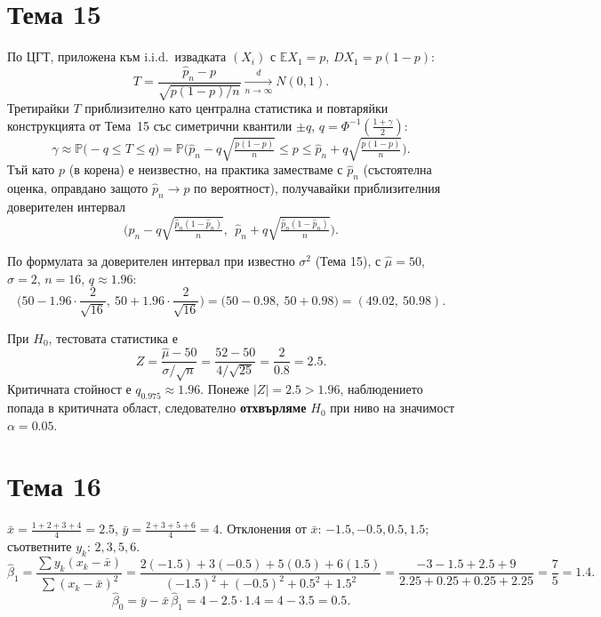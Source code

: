 \section*{Тема 15}

\begin{proofbox}
По ЦГТ, приложена към i.i.d.\ извадката $(X_i)$ с $\mathbb EX_1=p$,
$DX_1=p(1-p)$:
\[
  T = \frac{\hat p_n-p}{\sqrt{p(1-p)/n}} \xrightarrow[n\to\infty]{d}
  N(0,1).
\]
Третирайки $T$ приблизително като централна статистика и повтаряйки
конструкцията от Тема~15 със симетрични квантили $\pm q$, $q=
\Phi^{-1}(\tfrac{1+\gamma}2)$:
\[
  \gamma \approx \mathbb P\big(-q\le T\le q\big) = \mathbb P\Big(
  \hat p_n - q\sqrt{\tfrac{p(1-p)}n} \le p \le \hat p_n+q\sqrt{
  \tfrac{p(1-p)}n}\Big).
\]
Тъй като $p$ (в корена) е неизвестно, на практика заместваме с
$\hat p_n$ (състоятелна оценка, оправдано защото $\hat p_n\to p$ по
вероятност), получавайки приблизителния доверителен интервал
\[
  \Big(\hat p_n - q\sqrt{\tfrac{\hat p_n(1-\hat p_n)}n},\ \ \hat p_n
  + q\sqrt{\tfrac{\hat p_n(1-\hat p_n)}n}\Big).
\]
\end{proofbox}

\begin{proofbox}
По формулата за доверителен интервал при известно $\sigma^2$ (Тема
15), с $\hat\mu=50$, $\sigma=2$, $n=16$, $q\approx1.96$:
\[
  \Big(50-1.96\cdot\frac2{\sqrt{16}},\ 50+1.96\cdot\frac2{\sqrt{16}}
  \Big) = \big(50-0.98,\ 50+0.98\big) = (49.02,\ 50.98).
\]
\end{proofbox}

\begin{proofbox}
При $H_0$, тестовата статистика е
\[
  Z = \frac{\hat\mu-50}{\sigma/\sqrt n} = \frac{52-50}{4/\sqrt{25}} =
  \frac2{0.8} = 2.5.
\]
Критичната стойност е $q_{0.975}\approx1.96$. Понеже $|Z|=2.5>1.96$,
наблюдението попада в критичната област, следователно \textbf{
отхвърляме} $H_0$ при ниво на значимост $\alpha=0.05$.
\end{proofbox}

\section*{Тема 16}

\begin{proofbox}
$\bar x = \tfrac{1+2+3+4}4=2.5$, $\bar y=\tfrac{2+3+5+6}4=4$.
Отклонения от $\bar x$: $-1.5,-0.5,0.5,1.5$; съответните $y_k$:
$2,3,5,6$.
\[
  \hat\beta_1 = \frac{\sum y_k(x_k-\bar x)}{\sum(x_k-\bar x)^2} =
  \frac{2(-1.5)+3(-0.5)+5(0.5)+6(1.5)}{(-1.5)^2+(-0.5)^2+0.5^2+1.5^2}
  = \frac{-3-1.5+2.5+9}{2.25+0.25+0.25+2.25} = \frac7{5} = 1.4.
\]
\[
  \hat\beta_0 = \bar y - \bar x\,\hat\beta_1 = 4 - 2.5\cdot1.4 = 4-
  3.5 = 0.5.
\]
\end{proofbox}

